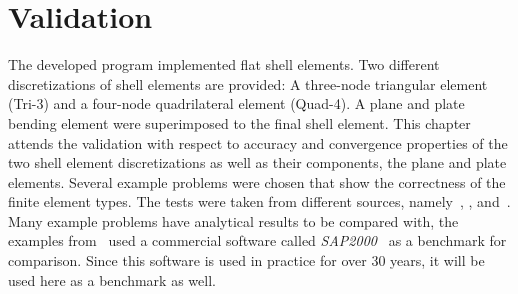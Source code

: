 \section{Validation}\label{sec:valid}
The developed program implemented flat shell elements. Two different discretizations of shell elements are provided: A three-node triangular element (Tri-3) and a four-node quadrilateral element (Quad-4). A plane and plate bending element were superimposed to the final shell element. This chapter attends the validation with respect to accuracy and convergence properties of the two shell element discretizations as well as their components, the plane and plate elements. Several example problems were chosen that show the correctness of the finite element types. The tests were taken from different sources, namely~\cite{kansara2004development}, \cite{macneal1985proposed}, \cite{wilson1996three} and~\cite{jin1994analysis}. Many example problems have analytical results to be compared with, the examples from~\cite{kansara2004development} used a commercial software called \textit{SAP2000}~\cite{sap-2000} as a benchmark for comparison. Since this software is used in practice for over 30 years, it will be used here as a benchmark as well.
